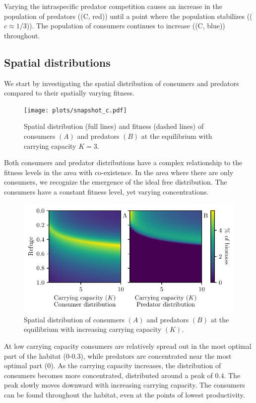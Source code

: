 Varying the intraspecific predator competition causes an increase in the population of predators ((C, red)) until a point where the population stabilizes (($c\approx 1/3$)). The population of consumers continues to increase ((C, blue)) throughout.


\subsection{Spatial distributions}
We start by investigating the spatial distribution of consumers and predators compared to their spatially varying fitness.
\begin{figure}[H]
  \caption{Spatial distribution (full lines) and fitness (dashed lines) of consumers $(A)$  and predators $(B)$ at the equilibrium with carrying capacity $K = 3$.}
  \label{fig:snapshot}
  \texttt{[image: plots/snapshot\_c.pdf]}
\end{figure}
Both consumers and predator distributions have a complex relationship to the fitness levels in the area with co-existence. In the area where there are only consumers, we recognize the emergence of the ideal free distribution. The consumers have a constant fitness level, yet varying concentrations.

\begin{figure}[H]
  \caption{Spatial distribution of consumers $(A)$ and predators $(B)$ at the equilibrium with increasing carrying capacity $(K)$.}
  \label{fig:strat_car}
  \includegraphics{plots/increasing_car_cap_c.pdf}
\end{figure}

At low carrying capacity consumers are relatively spread out in the most optimal part of the habitat (0-0.3), while predators are concentrated near the most optimal part (0). As the carrying capacity increases, the distribution of consumers becomes more concentrated, distributed around a peak of $0.4$. The peak slowly moves downward with increasing carrying capacity. The consumers can be found throughout the habitat, even at the points of lowest productivity.


